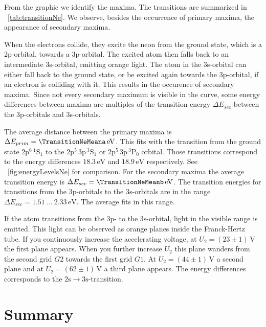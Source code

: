 \documentclass[a4paper,10pt,twocolumn]{article}
\newcommand{\volt}{\, \mathrm{V}}
\newcommand{\eV}{\, \mathrm{eV}}
\newcommand{\neLevelA}{2\mathrm{p}^{5} \, 3\mathrm{p} \, ^{3}\mathrm{P}_0}
\newcommand{\neLevelAA}{2\mathrm{p}^{5} \, 3\mathrm{p} \, ^{3}\mathrm{S}_1}
\newcommand{\neLevelGround}{2\mathrm{p}^{6} \, ^{1}\mathrm{S}_1}
\newcommand{\TheoreticalTransitionNea}{18.9}
\newcommand{\TheoreticalTransitionNeaa}{18.3}
\newcommand{\TheoreticalTransitionNeb}{1.51 \ \dots \ 2.33}
\begin{document}
    From the graphic we identify the maxima.
    The transitions are summarized in ~\autoref{tab:transitionNe}.
    We observe, besides the occurrence of primary maxima, the appearance of secondary maxima.
    
    When the electrons collide, they excite the neon from the ground state, which is a 2p-orbital, towards a 3p-orbital.
    The excited atom then falls back to an intermediate 3s-orbital, emitting orange light.
    The atom in the 3s-orbital can either fall back to the ground state, or be excited again towards the
    3p-orbital, if an electron is colliding with it.
    This results in the occurence of secondary maxima.
    Since not every secondary maximum is visible in the curve, some energy differences
    between maxima are multiples of the transition energy $\Delta E_{sec}$
    between the 3p-orbitals and 3s-orbitals.
    
    The average distance between the primary maxima is $\Delta E_{prim} = \TransitionNeMeana \eV$.
    This fits with the transition from the ground state $\neLevelGround$ to the $\neLevelAA$ or $\neLevelA$ orbital.
    Those transitions correspond to the energy differences $\TheoreticalTransitionNeaa \eV$ and $\TheoreticalTransitionNea \eV$
    respectively.
    See ~\autoref{fig:energyLevelsNe} for comparison.
    For the secondary maxima the average transition energy is $\Delta E_{sec} = \TransitionNeMeanb \eV$.
    The transition energies for transitions from the 3p-orbitals to the 3s-orbitals are in the range
    $\Delta E_{sec} = \TheoreticalTransitionNeb \eV$.
    The average fits in this range.
    
    If the atom transitions from the 3p- to the 3s-orbital, light in the visible range is emitted.
    This light can be observed as orange planes inside the Franck-Hertz tube.
    If you continuously increase the accelerating voltage, at $U_2 = (23 \pm 1) \volt$ the first plane appears.
    When you further increase $U_2$ this plane wanders from the second grid $G2$ towards the first grid $G1$.
    At $U_2 = (44 \pm 1)\volt$ a second plane and at $U_2 = (62 \pm 1)\volt$ a third plane appears.
    The energy differences corresponds to the $\mathrm{2s} \rightarrow \mathrm{3s}$-transition.
    
    \section{Summary}
    
\end{document}
